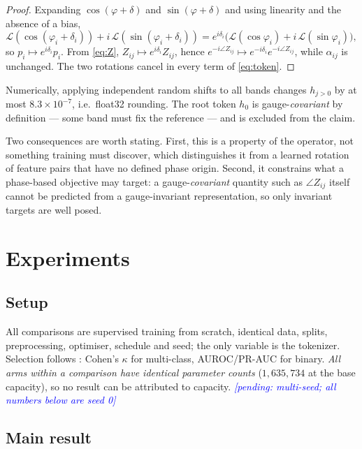 \documentclass{article}
\newcommand{\pending}[1]{\textcolor{blue}{\textit{[pending: #1]}}}
\begin{document}
\begin{proof}
Expanding $\cos(\varphi+\delta)$ and $\sin(\varphi+\delta)$ and using linearity
and the absence of a bias,
\[
\mathcal{L}(\cos(\varphi_i{+}\delta_i)) + i\,\mathcal{L}(\sin(\varphi_i{+}\delta_i))
= e^{i\delta_i}\bigl(\mathcal{L}(\cos\varphi_i) + i\,\mathcal{L}(\sin\varphi_i)\bigr),
\]
so $p_i \mapsto e^{i\delta_i} p_i$. From \eqref{eq:Z}, $Z_{ij} \mapsto e^{i\delta_i} Z_{ij}$,
hence $e^{-i\angle Z_{ij}} \mapsto e^{-i\delta_i} e^{-i\angle Z_{ij}}$, while
$\alpha_{ij}$ is unchanged. The two rotations cancel in every term of
\eqref{eq:token}.
\end{proof}

Numerically, applying independent random shifts to all bands changes
$h_{j>0}$ by at most $8.3\times 10^{-7}$, i.e.\ float32 rounding. The root
token $h_0$ is gauge-\emph{covariant} by definition --- some band must fix the
reference --- and is excluded from the claim.

Two consequences are worth stating. First, this is a property of the operator,
not something training must discover, which distinguishes it from a learned
rotation of feature pairs that have no defined phase origin. Second, it
constrains what a phase-based objective may target: a gauge-\emph{covariant}
quantity such as $\angle Z_{ij}$ itself cannot be predicted from a
gauge-invariant representation, so only invariant targets are well posed.

\section{Experiments}

\subsection{Setup}

All comparisons are supervised training from scratch, identical data, splits,
preprocessing, optimiser, schedule and seed; the only variable is the tokenizer.
Selection follows \citet{yang2023biot}: Cohen's $\kappa$ for multi-class,
AUROC/PR-AUC for binary. \emph{All arms within a comparison have identical
parameter counts} ($1{,}635{,}734$ at the base capacity), so no result can be
attributed to capacity.
\pending{multi-seed; all numbers below are seed 0}

\subsection{Main result}
\end{document}
